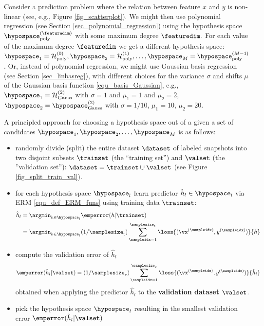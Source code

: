 \documentclass[12pt]{report}
\begin{document}
Consider a prediction problem where the relation between feature $x$ and $y$ is non-linear (see, e.g., Figure \ref{fig_scatterplot}). 
We might then use polynomial regression (see Section \ref{sec_polynomial_regression}) using the hypothesis 
space $\hypospace_{\rm poly}^{(\featuredim)}$ with some maximum degree $\featuredim$. For each value of the 
maximum degree $\featuredim$ we get a different hypothesis space: $\hypospace_{1} = \mathcal{H}_{\rm poly}^{(0)},\hypospace_{2} = \mathcal{H}_{\rm poly}^{(1)},\ldots,\hypospace_{M} = \hypospace_{\rm poly}^{(M-1)}$. 
Or, instead of polynomial regression, we might use Gaussian basis regression (see Section \ref{sec_linbasreg}), 
with different choices for the variance $\sigma$ and shifts $\mu$ of the Gaussian basis function \eqref{equ_basis_Gaussian}, 
e.g., $\hypospace_{1} = \mathcal{H}^{(2)}_{\rm Gauss}$ with $\sigma=1$ and $\mu_{1}=1$ and $\mu_{2}=2$, 
$\hypospace_{2} = \hypospace^{(2)}_{\rm Gauss}$ with $\sigma = 1/10$, $\mu_{1}=10$, $\mu_{2}= 20$.

A principled approach for choosing a hypothesis space out of a given a set of candidates $\hypospace_{1},\hypospace_{2},\ldots,\hypospace_{M}$ is as follows: 
\begin{itemize} 
\item randomly divide (split) the entire dataset $\dataset$ of labeled snapshots into two disjoint subsets 
$\trainset$ (the ``training set'') and $\valset$ (the ''validation set''): 
$\dataset = \trainset \cup \valset$ (see Figure \ref{fig_split_train_val}). 
\item for each hypothesis space $\hypospace_{l}$ learn predictor $\hat{h}_{l} \in \hypospace_{l}$ via ERM \eqref{equ_def_ERM_funs} using training data $\trainset$:
\begin{align} 
\label{equ_def_hat_h_fitting_sel}
\hat{h}_{l} & = \argmin_{h \in \hypospace_{l}} \emperror(h| \trainset) \nonumber \\
& = \argmin_{h \in \hypospace_{l}}  (1/\samplesize_{\rm t}) \sum_{\sampleidx=1}^{\samplesize_{\rm t}} \loss{(\vx^{(\sampleidx)},y^{(\sampleidx)})}{h} %
\end{align} 
\item compute the validation error of $\hat{h}_{l}$ 
\begin{equation} 
\label{equ_def_training_val_val_modsel}
\emperror(\hat{h}_{l}|\valset) = (1/\samplesize_{\rm v}) \sum_{\sampleidx=1}^{\samplesize_{\rm v}} \loss{(\vx^{(\sampleidx)},y^{(\sampleidx)})} {\hat{h}_{l}}  %
\end{equation}  
obtained when applying the predictor $\hat{h}_{l}$ to the {\bf validation dataset} $\valset$. 
\item pick the hypothesis space $\hypospace_{l}$ resulting in the smallest validation error $\emperror(\hat{h}_{l}|\valset)$
\end{itemize} 
\end{document}
